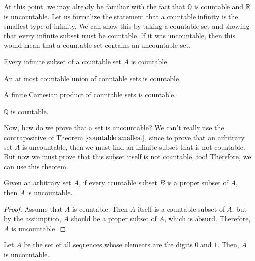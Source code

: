 \documentclass{article}
\begin{document}
  At this point, we may already be familiar with the fact that $\mathbb{Q}$ is countable and $\mathbb{R}$ is uncountable. Let us formalize the statement that a countable infinity is the smallest type of infinity. We can show this by taking a countable set and showing that every infinite subset must be countable. If it was uncountable, then this would mean that a countable set contains an uncountable set. 

  \begin{theorem}
    \label{countable smallest}
    Every infinite subset of a countable set $A$ is countable. 
  \end{theorem}

  \begin{theorem}
    An at most countable union of countable sets is countable. 
  \end{theorem}

  \begin{theorem}
    A finite Cartesian product of countable sets is countable. 
  \end{theorem}

  \begin{corollary}
    $\mathbb{Q}$ is countable. 
  \end{corollary}

  Now, how do we prove that a set is uncountable? We can't really use the contrapositive of Theorem $\ref{countable smallest}$, since to prove that an arbitrary set $A$ is uncountable, then we must find an infinite subset that is not countable. But now we must prove that this subset itself is not countable, too! Therefore, we can use this theorem. 

  \begin{theorem}
    Given an arbitrary set $A$, if every countable subset $B$ is a proper subset of $A$, then $A$ is uncountable. 
  \end{theorem}
  \begin{proof}
    Assume that $A$ is countable. Then $A$ itself is a countable subset of $A$, but by the assumption, $A$ should be a proper subset of $A$, which is absurd. Therefore, $A$ is uncountable. 
  \end{proof}

  \begin{theorem}
    Let $A$ be the set of all sequences whose elements are the digits $0$ and $1$. Then, $A$ is uncountable. 
  \end{theorem}
\end{document}
